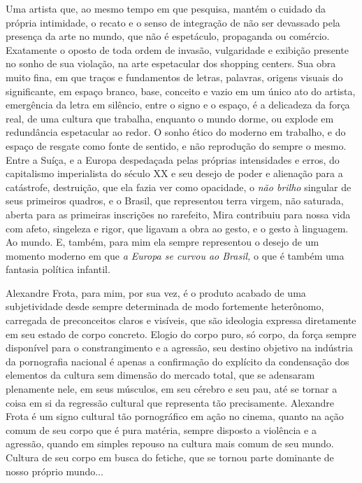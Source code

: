 Uma artista que, ao mesmo tempo em que pesquisa, mantém o cuidado da
própria intimidade, o recato e o senso de integração de não ser
devassado pela presença da arte no mundo, que não é espetáculo,
propaganda ou comércio. Exatamente o oposto de toda ordem de invasão,
vulgaridade e exibição presente no sonho de sua violação, na arte
espetacular dos shopping centers. Sua obra muito fina, em que traços e
fundamentos de letras, palavras, origens visuais do significante, em
espaço branco, base, conceito e vazio em um único ato do artista,
emergência da letra em silêncio, entre o signo e o espaço, é a
delicadeza da força real, de uma cultura que trabalha, enquanto o mundo
dorme, ou explode em redundância espetacular ao redor. O sonho ético do
moderno em trabalho, e do espaço de resgate como fonte de sentido, e não
reprodução do sempre o mesmo. Entre a Suíça, e a Europa despedaçada
pelas próprias intensidades e erros, do capitalismo imperialista do
século XX e seu desejo de poder e alienação para a catástrofe,
destruição, que ela fazia ver como opacidade, o \emph{não brilho}
singular de seus primeiros quadros, e o Brasil, que representou terra
virgem, não saturada, aberta para as primeiras inscrições no rarefeito,
Mira contribuiu para nossa vida com afeto, singeleza e rigor, que
ligavam a obra ao gesto, e o gesto à linguagem. Ao mundo. E, também,
para mim ela sempre representou o desejo de um momento moderno em que
\emph{a Europa se curvou ao Brasil,} o que é também uma fantasia
política infantil.

Alexandre Frota, para mim, por sua vez, é o produto acabado de uma
subjetividade desde sempre determinada de modo fortemente heterônomo,
carregada de preconceitos claros e visíveis, que são ideologia expressa
diretamente em seu estado de corpo concreto. Elogio do corpo puro, só
corpo, da força sempre disponível para o constrangimento e a agressão,
seu destino objetivo na indústria da pornografia nacional é apenas a
confirmação do explícito da condensação dos elementos da cultura sem
dimensão do mercado total, que se adensaram plenamente nele, em seus
músculos, em seu cérebro e seu pau, até se tornar a coisa em si da
regressão cultural que representa tão precisamente. Alexandre Frota é um
signo cultural tão pornográfico em ação no cinema, quanto na ação comum
de seu corpo que é pura matéria, sempre disposto a violência e a
agressão, quando em simples repouso na cultura mais comum de seu mundo.
Cultura de seu corpo em busca do fetiche, que se tornou parte dominante
de nosso próprio mundo...

